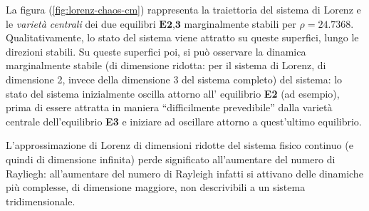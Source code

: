 La figura (\ref{fig:lorenz-chaos-cm}) rappresenta la traiettoria del sistema di Lorenz e le
 \textit{varietà centrali} dei due equilibri $\textbf{E2,3}$ marginalmente stabili 
 per $\rho = 24.7368$. Qualitativamente, lo stato del sistema viene attratto su queste
 superfici, lungo le direzioni stabili. Su queste superfici poi, si può osservare la dinamica
 marginalmente stabile (di dimensione ridotta: per il sistema di Lorenz, di dimensione 2, invece
 della dimensione 3 del sistema completo) del sistema: lo stato del sistema inizialmente
 oscilla attorno all' equilibrio \textbf{E2} (ad esempio),
 prima di essere attratta in maniera ``difficilmente prevedibile''
 dalla varietà centrale dell'equilibrio \textbf{E3} e iniziare ad oscillare attorno a 
 quest'ultimo equilibrio.

\vspace{0.3cm}
\noindent
L'approssimazione di Lorenz di dimensioni ridotte del sistema fisico continuo (e quindi
 di dimensione infinita) perde significato all'aumentare del numero di Rayliegh: all'aumentare
 del numero di Rayleigh infatti si attivano delle dinamiche più complesse, di dimensione
 maggiore, non descrivibili a un sistema tridimensionale.


